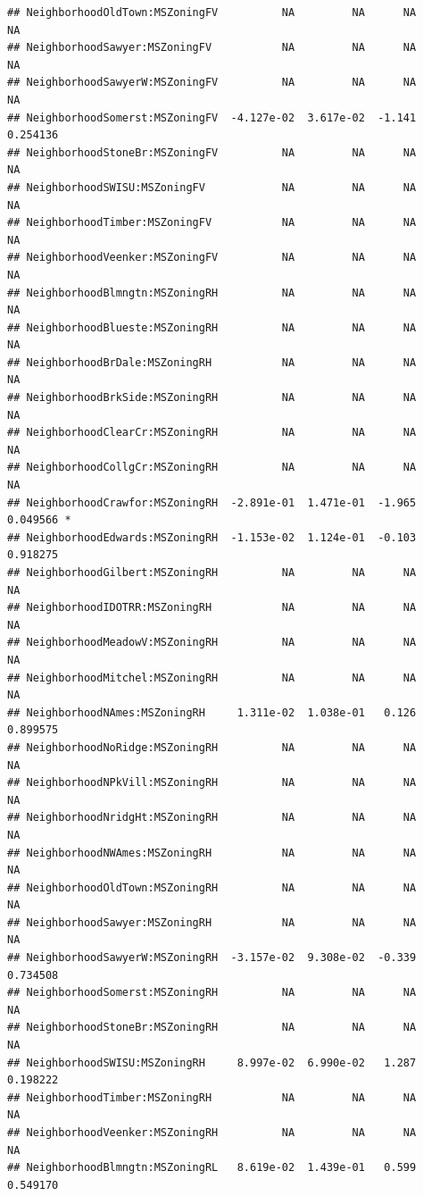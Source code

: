 \documentclass[american,]{article}
\theoremstyle{definition}
\theoremstyle{definition}
\theoremstyle{definition}
\theoremstyle{remark}
\begin{document}
\begin{verbatim}
## NeighborhoodOldTown:MSZoningFV          NA         NA      NA       NA    
## NeighborhoodSawyer:MSZoningFV           NA         NA      NA       NA    
## NeighborhoodSawyerW:MSZoningFV          NA         NA      NA       NA    
## NeighborhoodSomerst:MSZoningFV  -4.127e-02  3.617e-02  -1.141 0.254136    
## NeighborhoodStoneBr:MSZoningFV          NA         NA      NA       NA    
## NeighborhoodSWISU:MSZoningFV            NA         NA      NA       NA    
## NeighborhoodTimber:MSZoningFV           NA         NA      NA       NA    
## NeighborhoodVeenker:MSZoningFV          NA         NA      NA       NA    
## NeighborhoodBlmngtn:MSZoningRH          NA         NA      NA       NA    
## NeighborhoodBlueste:MSZoningRH          NA         NA      NA       NA    
## NeighborhoodBrDale:MSZoningRH           NA         NA      NA       NA    
## NeighborhoodBrkSide:MSZoningRH          NA         NA      NA       NA    
## NeighborhoodClearCr:MSZoningRH          NA         NA      NA       NA    
## NeighborhoodCollgCr:MSZoningRH          NA         NA      NA       NA    
## NeighborhoodCrawfor:MSZoningRH  -2.891e-01  1.471e-01  -1.965 0.049566 *  
## NeighborhoodEdwards:MSZoningRH  -1.153e-02  1.124e-01  -0.103 0.918275    
## NeighborhoodGilbert:MSZoningRH          NA         NA      NA       NA    
## NeighborhoodIDOTRR:MSZoningRH           NA         NA      NA       NA    
## NeighborhoodMeadowV:MSZoningRH          NA         NA      NA       NA    
## NeighborhoodMitchel:MSZoningRH          NA         NA      NA       NA    
## NeighborhoodNAmes:MSZoningRH     1.311e-02  1.038e-01   0.126 0.899575    
## NeighborhoodNoRidge:MSZoningRH          NA         NA      NA       NA    
## NeighborhoodNPkVill:MSZoningRH          NA         NA      NA       NA    
## NeighborhoodNridgHt:MSZoningRH          NA         NA      NA       NA    
## NeighborhoodNWAmes:MSZoningRH           NA         NA      NA       NA    
## NeighborhoodOldTown:MSZoningRH          NA         NA      NA       NA    
## NeighborhoodSawyer:MSZoningRH           NA         NA      NA       NA    
## NeighborhoodSawyerW:MSZoningRH  -3.157e-02  9.308e-02  -0.339 0.734508    
## NeighborhoodSomerst:MSZoningRH          NA         NA      NA       NA    
## NeighborhoodStoneBr:MSZoningRH          NA         NA      NA       NA    
## NeighborhoodSWISU:MSZoningRH     8.997e-02  6.990e-02   1.287 0.198222    
## NeighborhoodTimber:MSZoningRH           NA         NA      NA       NA    
## NeighborhoodVeenker:MSZoningRH          NA         NA      NA       NA    
## NeighborhoodBlmngtn:MSZoningRL   8.619e-02  1.439e-01   0.599 0.549170    

\end{verbatim}
\end{document}
